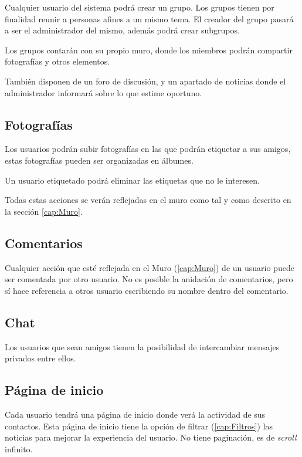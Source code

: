 \documentclass[12pt, a4paper, titlepage]{article}
\begin{document}
Cualquier usuario del sistema podrá crear un grupo. Los grupos tienen por finalidad reunir a personas afines a un mismo tema. El creador del grupo pasará a ser el administrador del mismo, además podrá crear subgrupos.

Los grupos contarán con su propio muro, donde los miembros podrán compartir fotografías y otros elementos.

También disponen de un foro de discusión, y un apartado de noticias donde el administrador informará sobre lo que estime oportuno.

\subsection{Fotografías}

Los usuarios podrán subir fotografías en las que podrán etiquetar a sus amigos, estas fotografías pueden ser organizadas en álbumes.

Un usuario etiquetado podrá eliminar las etiquetas que no le interesen.

Todas estas acciones se verán reflejadas en el muro como tal y como descrito en la sección \ref{cap:Muro}.

\subsection{Comentarios}

Cualquier acción que esté reflejada en el Muro (\ref{cap:Muro}) de un usuario puede ser comentada por otro usuario.
No es posible la anidación de comentarios, pero sí hace referencia a otros usuario escribiendo su nombre dentro del comentario.

\subsection{Chat}

Los usuarios que sean amigos tienen la posibilidad de intercambiar mensajes privados entre ellos.

\subsection{Página de inicio}\label{cap:pag_inicio}

Cada usuario tendrá una página de inicio donde verá la actividad de sus contactos.
Esta página de inicio tiene la opción de filtrar (\ref{cap:Filtros}) las noticias para mejorar la experiencia del usuario. 
No tiene paginación, es de  \textit{scroll} infinito. 
\end{document}
